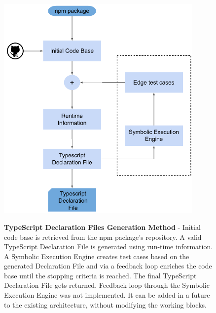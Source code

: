\begin{figure}[tp]
\begin{centering}
    {\includegraphics[width=0.9\textwidth]{figures/approach/typescript-declaration-files-generation-method/typescript_declaration_files_generation_method_block_diagram.pdf}}
    \caption[TypeScript Declaration Files Generation Method]{\textbf{TypeScript Declaration Files Generation Method} - Initial code base is retrieved from the npm package's repository. A valid TypeScript Declaration File is generated using run-time information. A Symbolic Execution Engine creates test cases based on the generated Declaration File and via a feedback loop enriches the code base until the stopping criteria is reached. The final TypeScript Declaration File gets returned. Feedback loop through the Symbolic Execution Engine was not implemented. It can be added in a future to the existing architecture, without modifying the working blocks.}
    \label{fig:tsd_generation_method_block_diagram}
\end{centering}
\end{figure}
